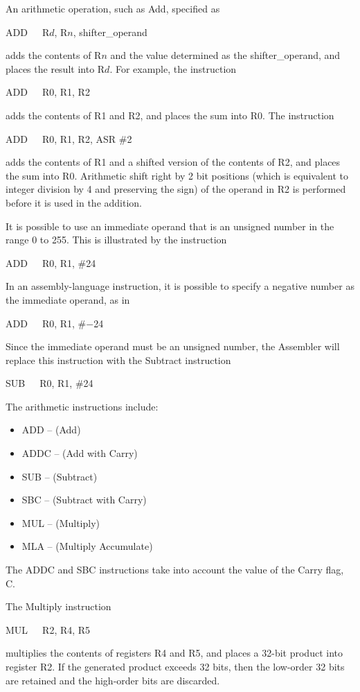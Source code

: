 \documentclass[11pt, twoside, pdftex]{article}
\begin{document}
An arithmetic operation, such as Add, specified as
\begin{center}
ADD~~~R$d$, R$n$, shifter\_operand
\end{center}
\noindent
adds the contents of R$n$ and the value
determined as the shifter\_operand, and places the result 
into R$d$. For example, the instruction
\begin{center}
ADD~~~R0, R1, R2
\end{center}
\noindent
adds the contents of R1 and R2, and places the sum into R0.
The instruction
\begin{center}
ADD~~~R0, R1, R2, ASR \#2
\end{center}
\noindent
adds the contents of R1 and a shifted version of the contents of
R2, and places the sum into R0. Arithmetic shift right by 2 bit
positions (which is equivalent to integer division by 4 and
preserving the sign) of the operand in R2 is performed before it is used in the addition. 

It is possible to use an immediate operand that is an unsigned
number in the range 0 to 255. This is illustrated by the
instruction
\begin{center}
ADD~~~R0, R1, \#24
\end{center}
\noindent
In an assembly-language instruction, it is possible to specify
a negative number as the immediate operand, as in
\begin{center}
ADD~~~R0, R1, \#$-$24
\end{center}
\noindent 
Since the immediate operand must be an unsigned number, the
Assembler will replace this instruction with the Subtract
instruction
\begin{center}
SUB~~~R0, R1, \#24
\end{center}

The arithmetic instructions include: 
\begin{itemize}
\item ADD -- (Add)
\item ADDC -- (Add with Carry)
\item SUB -- (Subtract)
\item SBC -- (Subtract with Carry)
\item MUL -- (Multiply)
\item MLA -- (Multiply Accumulate)
\end{itemize}
\noindent
The ADDC and SBC instructions take into account the value of
the Carry flag, C.

The Multiply instruction
\begin{center}
MUL~~~R2, R4, R5
\end{center}
\noindent
multiplies the contents of registers R4 and R5, and places a
32-bit product into register R2. If the generated product exceeds
32 bits, then the low-order 32 bits are retained and the 
high-order bits are discarded.
\end{document}
